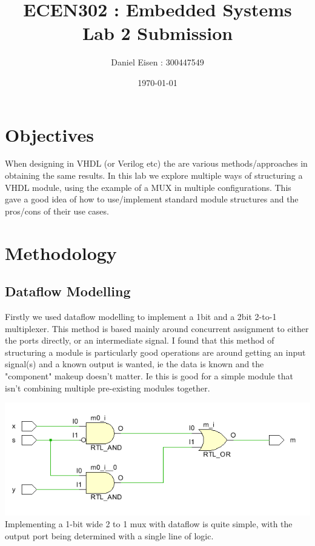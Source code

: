 \documentclass[11pt]{article}
\title{ECEN302 : Embedded Systems \\ Lab 2 Submission}
\author{Daniel Eisen : 300447549}
\date{\today}
\begin{document}
\begin{preview}
\maketitle
\section{Objectives}
When designing in VHDL (or Verilog etc) the are various methods/approaches in obtaining the same results. In this lab we explore multiple ways of structuring a VHDL module, using the example of a MUX in multiple configurations. This gave a good idea of how to use/implement standard module structures and the pros/cons of their use cases.


\section{Methodology}
        \subsection{Dataflow Modelling}
        Firstly we used dataflow modelling to implement a 1bit and a 2bit 2-to-1 multiplexer. This method is based mainly around concurrent assignment to either the ports directly, or an intermediate signal. I found that this method of structuring a module is particularly good operations are around getting an input signal(s) and a known output is wanted, ie the data is known and the "component" makeup doesn't matter. Ie this is good for a simple module that isn't combining multiple pre-existing modules together.

        \includegraphics[width=\textwidth]{res/part1/part1_1Wmux2_1.PNG}
        Implementing a 1-bit wide 2 to 1 mux with dataflow is quite simple, with the output port being determined with a single line of logic.\\


\end{preview}
\end{document}
